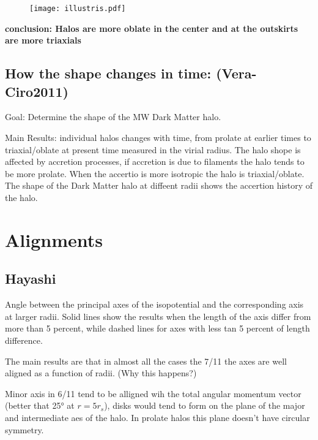 \begin{figure}[H]
\texttt{[image: illustris.pdf]}
\end{figure}

\textbf{conclusion: Halos are more oblate in the center and at the outskirts are more triaxials}


\subsection{How the shape changes in time: (Vera-Ciro2011)}

Goal:  Determine the shape of the MW Dark Matter halo.

Main Results: individual halos changes with time, from prolate at earlier times 
to triaxial/oblate at present time measured in the virial radius. The halo 
shope is affected by accretion processes, if accretion is due to filaments
the halo tends to be more prolate. When the accertio is more isotropic the halo
is triaxial/oblate. The shape of the Dark Matter halo at diffeent radii shows 
the accertion history of the halo.    






\section{Alignments}

\subsection{Hayashi}

Angle between the principal axes of the isopotential and the corresponding
axis at larger radii. Solid lines show the results when the length of the 
axis differ from more than 5 percent, while dashed lines for axes with 
less tan 5 percent of length difference.

The main results are that in almost all the cases the 7/11 the axes are 
well aligned as a function of radii. (Why this happens?)

Minor axis in 6/11 tend to be alligned wih the total angular momentum vector 
(better that 25° at $r=5r_s$), disks would tend to form on the plane of 
the major and intermediate aes of the halo. In prolate halos this plane
doesn't have circular symmetry.


